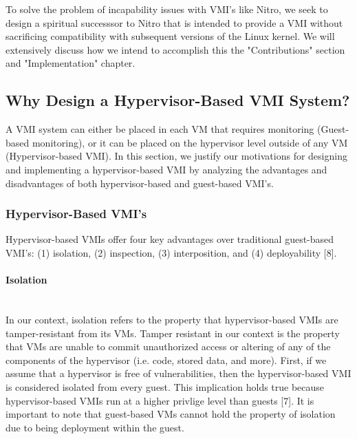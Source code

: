 \documentclass{report}
\begin{document}
\begin{spacing}{1.5}
{\large
To solve the problem of incapability issues with VMI's like Nitro, we seek to design a spiritual successsor to Nitro that is intended to provide a VMI without sacrificing compatibility with subsequent versions of the Linux kernel. We will extensively discuss how we intend to accomplish this the "Contributions" section and "Implementation" chapter.
\newline
}










\subsection{Why Design a Hypervisor-Based VMI System?}

{\large
A VMI system can either be placed in each VM that requires monitoring (Guest-based monitoring), or it can be placed on the hypervisor level outside of any VM (Hypervisor-based VMI). In this section, we justify our motivations for designing and implementing a hypervisor-based VMI by analyzing the advantages and disadvantages of both hypervisor-based and guest-based VMI's. 
}

\subsubsection{Hypervisor-Based VMI's}


{\large
Hypervisor-based VMIs offer four key advantages over traditional guest-based VMI's: (1) isolation, (2) inspection, (3) interposition, and (4) deployability [8].
\newline
}

\paragraph{Isolation}\mbox{}\\

{\large
In our context, isolation refers to the property that hypervisor-based VMIs are tamper-resistant from its VMs. Tamper resistant in our context is the property that VMs are unable to commit unauthorized access or altering of any of the components of the hypervisor (i.e. code, stored data, and more). First, if we assume that a hypervisor is free of vulnerabilities, then the hypervisor-based VMI is considered isolated from every guest. This implication holds true because hypervisor-based VMIs run at a higher privlige level than guests [7]. It is important to note that guest-based VMs cannot hold the property of isolation due to being deployment within the guest.
\newline
}


\end{spacing}
\end{document}
